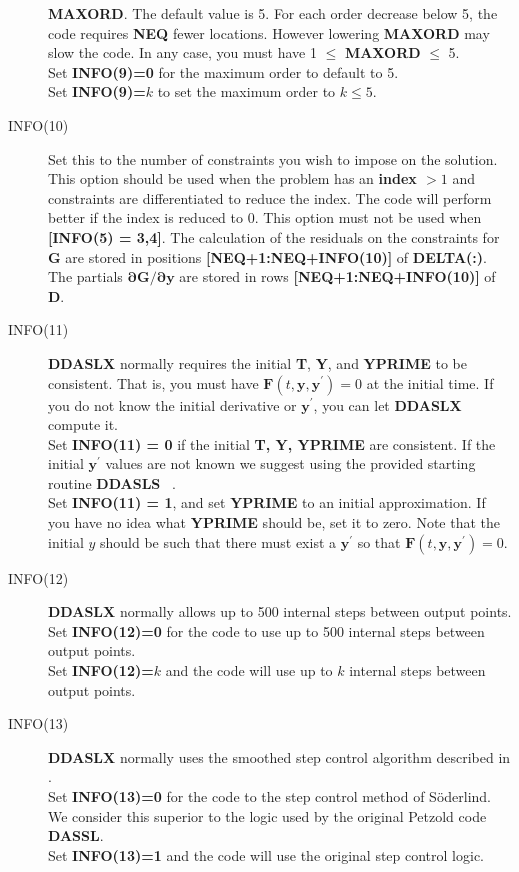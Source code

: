\documentclass[twoside]{MATH77}
\begin{document}
\begin{description}
  \textbf{MAXORD}.  The default value is 5.  For each order decrease
  below 5, the code requires \textbf{NEQ} fewer locations.  However
  lowering \textbf{MAXORD} may slow the code. In any case,
  you must have 1 $\leq$ \textbf{MAXORD} $\leq$ 5.\\
  Set \textbf{INFO(9)=0 }for the maximum order to default to 5.\\
  Set \textbf{INFO(9)=$k$} to set the maximum order to $k \leq 5$.
\item[INFO(10)] \label{info10} Set this to the number of constraints
  you wish to impose on the solution. This option should be used when
  the problem has an \textbf{index $>1$} and constraints are differentiated to
  reduce the index.  The code will perform better if the index is
  reduced to 0.  This option must not be used when \textbf{[INFO(5) =
  3,4]}.  The calculation of the residuals on the
  constraints for $\mathbf{G}$ are stored in positions \textbf{[NEQ+1:NEQ+INFO(10)]}
  of \textbf{DELTA(:)}. The partials $\mathbf{\partial G/ \partial y}$
 are stored in rows \textbf{[NEQ+1:NEQ+INFO(10)]} of \textbf{D}.

\item[INFO(11)] \label{info11} \textbf{DDASLX} normally requires the
  initial \textbf{T}, \textbf{Y}, and \textbf{YPRIME} to be
  consistent.  That is, you must have
  $\mathbf{F}(t,\mathbf{y},\mathbf{y}^{\prime}) = 0$ at the initial
  time. If you do not know the initial derivative or
  $\mathbf{y}^{\prime}$, you can let \textbf{DDASLX} compute it.\\
  Set \textbf{INFO(11) = 0 }if the initial \textbf{T, Y, YPRIME} are
  consistent.  If the initial $\mathbf{y}^{\prime}$ values are not known we
 suggest using the provided starting routine
 \textbf{DDASLS} ~\pageref{starting}.\\
  Set \textbf{INFO(11) = 1}, and set \textbf{YPRIME} to an initial
  approximation.  If you have no idea what \textbf{YPRIME} should be,
  set it to zero. Note that the initial $y$ should be such that there
  must exist a $\mathbf{y}^{\prime}$ so that $\mathbf{F}(
  t,\mathbf{y},\mathbf{y}^{\prime }) =0.$
\item[INFO(12)] \label{info12} \textbf{DDASLX} normally allows up to
  500 internal steps
  between output points.\\
  Set \textbf{INFO(12)=0} for the code to use up to 500 internal
  steps between output points.\\
  Set \textbf{INFO(12)=$k$} and the code will use up to $k$ internal
  steps between output points.
\item[INFO(13)] \label{info13} \textbf{DDASLX} normally
  uses the smoothed step control algorithm described in
  \cite{Soderlind:2003:DFA}. \\
  Set \textbf{INFO(13)=0} for the code to the step control method of
  S{\"o}derlind.
  We consider this superior to the logic used by the original Petzold code \textbf{DASSL}.\\
  Set \textbf{INFO(13)=1} and the code will use the original step
  control logic.


\end{description}
\end{document}

